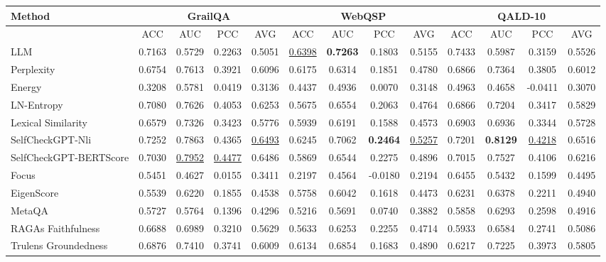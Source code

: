 \documentclass[11pt]{article}
\begin{document}
\begin{table}[t]
\centering
\fontsize{8.6pt}{10pt}\selectfont
\setlength{\tabcolsep}{2pt}
{
\renewcommand{\arraystretch}{1.3}
\begin{tabular}{l | c c c c | c c c c | c c c c}
\hline
\textbf{Method} & \multicolumn{4}{c}{\textbf{GrailQA}} & \multicolumn{4}{c}{\textbf{WebQSP}} & \multicolumn{4}{c}{\textbf{QALD-10}} \\
\hline
 & ACC & AUC & PCC & AVG & ACC & AUC & PCC & AVG & ACC & AUC & PCC & AVG \\
\hline
LLM & 0.7163 & 0.5729 & 0.2263 & 0.5051 & \underline{0.6398} & \textbf{0.7263} & 0.1803 & 0.5155 & 0.7433 & 0.5987 & 0.3159 & 0.5526 \\
Perplexity & 0.6754 & 0.7613 & 0.3921 & 0.6096 & 0.6175 & 0.6314 & 0.1851 & 0.4780 & 0.6866 & 0.7364 & 0.3805 & 0.6012 \\
Energy & 0.3208 & 0.5781 & 0.0419 & 0.3136 & 0.4437 & 0.4936 & 0.0070 & 0.3148 & 0.4963 & 0.4658 & -0.0411 & 0.3070 \\
LN-Entropy & 0.7080 & 0.7626 & 0.4053 & 0.6253 & 0.5675 & 0.6554 & 0.2063 & 0.4764 & 0.6866 & 0.7204 & 0.3417 & 0.5829 \\
Lexical Similarity & 0.6579 & 0.7326 & 0.3423 & 0.5776 & 0.5939 & 0.6191 & 0.1588 & 0.4573 & 0.6903 & 0.6936 & 0.3344 & 0.5728 \\
SelfCheckGPT-Nli & 0.7252 & 0.7863 & 0.4365 & \underline{0.6493} & 0.6245 & 0.7062 & \textbf{0.2464} & \underline{0.5257} & 0.7201 & \textbf{0.8129} & \underline{0.4218} & 0.6516 \\
SelfCheckGPT-BERTScore & 0.7030 & \underline{0.7952} & \underline{0.4477} & 0.6486 & 0.5869 & 0.6544 & 0.2275 & 0.4896 & 0.7015 & 0.7527 & 0.4106 & 0.6216 \\
Focus & 0.5451 & 0.4627 & 0.0155 & 0.3411 & 0.2197 & 0.4564 & -0.0180 & 0.2194 & 0.6455 & 0.5432 & 0.1599 & 0.4495 \\
EigenScore & 0.5539 & 0.6220 & 0.1855 & 0.4538 & 0.5758 & 0.6042 & 0.1618 & 0.4473 & 0.6231 & 0.6378 & 0.2211 & 0.4940 \\
MetaQA & 0.5727 & 0.5764 & 0.1396 & 0.4296 & 0.5216 & 0.5691 & 0.0740 & 0.3882 & 0.5858 & 0.6293 & 0.2598 & 0.4916 \\
\hline
RAGAs Faithfulness & 0.6688 & 0.6989 & 0.3210 & 0.5629 & 0.5633 & 0.6253 & 0.2255 & 0.4714 & 0.5933 & 0.6584 & 0.2741 & 0.5086 \\
Trulens Groundedness & 0.6876 & 0.7410 & 0.3741 & 0.6009 & 0.6134 & 0.6854 & 0.1683 & 0.4890 & 0.6217 & 0.7225 & 0.3973 & 0.5805 \\

\end{tabular}}
\end{table}
\end{document}
